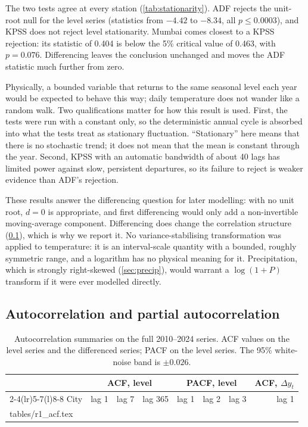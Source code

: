\documentclass[11pt,a4paper]{article}
\makeatletter
\newcommand{\tabfile}[1]{\@@input #1 }
\makeatother
\begin{document}
The two tests agree at every station (\cref{tab:stationarity}). ADF rejects the unit-root null for the level series (statistics from $-4.42$ to $-8.34$, all $p \leq 0.0003$), and KPSS does not reject level stationarity. Mumbai comes closest to a KPSS rejection: its statistic of 0.404 is below the 5\% critical value of 0.463, with $p = 0.076$. Differencing leaves the conclusion unchanged and moves the ADF statistic much further from zero.

Physically, a bounded variable that returns to the same seasonal level each year would be expected to behave this way; daily temperature does not wander like a random walk. Two qualifications matter for how this result is used. First, the tests were run with a constant only, so the deterministic annual cycle is absorbed into what the tests treat as stationary fluctuation. ``Stationary'' here means that there is no stochastic trend; it does not mean that the mean is constant through the year. Second, KPSS with an automatic bandwidth of about 40 lags has limited power against slow, persistent departures, so its failure to reject is weaker evidence than ADF's rejection.

These results answer the differencing question for later modelling: with no unit root, $d = 0$ is appropriate, and first differencing would only add a non-invertible moving-average component. Differencing does change the correlation structure (\cref{sec:acf}), which is why we report it. No variance-stabilising transformation was applied to temperature: it is an interval-scale quantity with a bounded, roughly symmetric range, and a logarithm has no physical meaning for it. Precipitation, which is strongly right-skewed (\cref{sec:precip}), would warrant a $\log(1+P)$ transform if it were ever modelled directly.

\subsection{Autocorrelation and partial autocorrelation}
\label{sec:acf}

\begin{table}[ht]
\centering
\small
\caption{Autocorrelation summaries on the full 2010--2024 series. ACF values on the level series and the differenced series; PACF on the level series. The 95\% white-noise band is $\pm 0.026$.}
\label{tab:acf}
\begin{tabular}{@{}l rrr rrr r@{}}
\toprule
 & \multicolumn{3}{c}{ACF, level} & \multicolumn{3}{c}{PACF, level} & ACF, $\Delta y_t$ \\
\cmidrule(lr){2-4}\cmidrule(lr){5-7}\cmidrule(l){8-8}
City & lag 1 & lag 7 & lag 365 & lag 1 & lag 2 & lag 3 & lag 1 \\
\midrule
\tabfile{tables/r1_acf.tex}
\bottomrule
\end{tabular}
\end{table}
\end{document}
